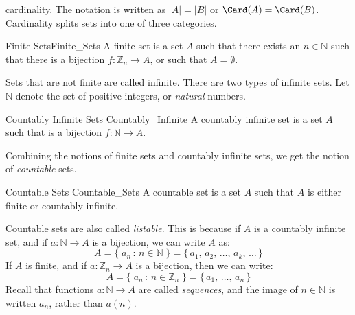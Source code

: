        cardinality. The notation is written as $|A|=|B|$ or $\Card(A)=\Card(B)$.
        Cardinality splits sets into one of three categories.
        \begin{ldefinition}{Finite Sets}{Finite_Sets}
            A finite set is a set $A$ such that there exists
            an $n\in\mathbb{N}$ such that there is a
            bijection $f:\mathbb{Z}_{n}\rightarrow{A}$, or
            such that $A=\emptyset$.
        \end{ldefinition}
        Sets that are not finite are called infinite. There
        are two types of infinite sets. Let $\mathbb{N}$
        denote the set of positive integers, or
        \textit{natural} numbers.
        \begin{ldefinition}{Countably Infinite Sets}
              {Countably_Infinite}
            A countably infinite set is a set $A$ such that
            is a bijection $f:\mathbb{N}\rightarrow{A}$.
        \end{ldefinition}
        Combining the notions of finite sets and countably
        infinite sets, we get the notion of
        \textit{countable} sets.
        \begin{ldefinition}{Countable Sets}
              {Countable_Sets}
            A countable set is a set $A$ such that $A$ is
            either finite or countably infinite.
        \end{ldefinition}
        Countable sets are also called \textit{listable}.
        This is because if $A$ is a countably infinite set,
        and if $a:\mathbb{N}\rightarrow{A}$ is a bijection,
        we can write $A$ as:
        \begin{equation}
            A=\{\;a_{n}\,:\,n\in\mathbb{N}\;\}
            =\{\,a_{1},\,a_{2},\,\dots,\,a_{k},\,\dots\,\}
        \end{equation}
        If $A$ is finite, and if
        $a:\mathbb{Z}_{n}\rightarrow{A}$ is a
        bijection, then we can write:
        \begin{equation}
            A=\{\;a_{n}\,:\,n\in\mathbb{Z}_{n}\;\}
             =\{\,a_{1},\,\dots,\,a_{n}\,\}
        \end{equation}
        Recall that functions $a:\mathbb{N}\rightarrow{A}$
        are called \textit{sequences}, and the image of
        $n\in\mathbb{N}$ is written $a_{n}$, rather than
        $a(n)$.
